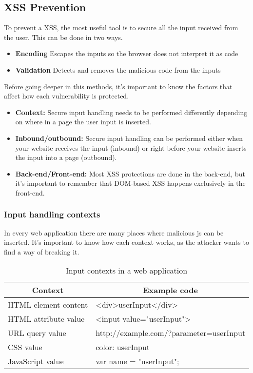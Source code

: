 
\subsection{XSS Prevention}
To prevent a XSS, the most useful tool is to secure all the input received from the user. This can be done in two ways.
\begin{itemize}
	\item\textbf{Encoding} Escapes the inputs so the browser does not interpret it as code
	\item\textbf{Validation} Detects and removes the malicious code from the inputs
\end{itemize}
Before going deeper in this methods, it's important to know the factors that affect how each vulnerability is protected.
\begin{itemize}
	\item \textbf{Context:} Secure input handling needs to be performed differently depending on where in a page the user input is inserted.
	\item \textbf{Inbound/outbound:} Secure input handling can be performed either when your website receives the input (inbound) or right before your website inserts the input into a page (outbound).
	\item \textbf{Back-end/Front-end:} Most XSS protections are done in the back-end, but it's important to remember that DOM-based XSS happens exclusively in the front-end.
\end{itemize}

\subsubsection{Input handling contexts}
In every web application there are many places where malicious js can be inserted. It's important to know how each context works, as the attacker wants to find a way of breaking it.

\begin{table}[]
	\centering
	\caption{Input contexts in a web application}
	\label{my-label}
	\begin{tabular}{|l|l|}
		\hline
		\multicolumn{1}{|c|}{\textbf{Context}} & \multicolumn{1}{c|}{\textbf{Example code}}                         \\ \hline
		HTML element content                   & \textless{}div\textgreater{}userInput\textless{}/div\textgreater{} \\ \hline
		HTML attribute value                   & \textless{}input value="userInput"\textgreater{}                   \\ \hline
		URL query value                        & http://example.com/?parameter=userInput                            \\ \hline
		CSS value                              & color: userInput                                                   \\ \hline
		JavaScript value                       & var name = "userInput";                                            \\ \hline
	\end{tabular}
\end{table}

